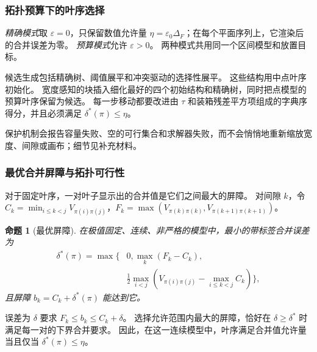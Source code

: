 \documentclass[fontset=none,zihao=5,a4paper]{ctexart}
\newtheorem{proposition}{命题}
\begin{document}
\subsubsection{拓扑预算下的叶序选择}
\emph{精确模式}取 $\varepsilon=0$，只保留数值允许量 $\eta=\varepsilon_0\Delta_F$；在每个平面序列上，它渲染后的合并误差为零。
\emph{预算模式}允许 $\varepsilon>0$。
两种模式共用同一个区间模型和放置目标。

候选生成包括精确树、阈值展平和冲突驱动的选择性展平。
这些结构用中点叶序初始化。
宽度感知的块插入细化最好的四个初始结构和精确树，同时把点模型的预算叶序保留为候选。
每一步移动都要改进由 $\tau$ 和装箱残差平方项组成的字典序得分，并且必须满足 $\delta^*(\pi)\le\eta$。

保护机制会报告容量失败、空的可行集合和求解器失败，而不会悄悄地重新缩放宽度、间隙或画布；细节见补充材料。

\subsubsection{最优合并屏障与拓扑可行性}
对于固定叶序，一对叶子显示出的合并值是它们之间最大的屏障。
对间隙 $k$，令 $C_k=\min_{i\le k<j}V_{\pi(i)\pi(j)}$，$F_k=\max(V_{\pi(k)\pi(k)},V_{\pi(k+1)\pi(k+1)})$。
\begin{proposition}[最优屏障]\label{prop:barriers}
在极值固定、连续、非严格的模型中，最小的带标签合并误差为
\begin{equation}\label{eq:delta}
\begin{split}
 \delta^*(\pi)=\max\bigg\{&0,\max_k(F_k-C_k),\\
 &\frac12\max_{i<j}\left(V_{\pi(i)\pi(j)}-
                         \max_{i\le k<j}C_k\right)\bigg\},
\end{split}
\end{equation}
且屏障 $b_k=C_k+\delta^*(\pi)$ 能达到它。
\end{proposition}
误差为 $\delta$ 要求 $F_k\le b_k\le C_k+\delta$。
选择允许范围内最大的屏障，恰好在 $\delta\ge\delta^*$ 时满足每一对的下界合并要求。
因此，在这一连续模型中，叶序满足合并值允许量当且仅当 $\delta^*(\pi)\le\eta$。
\end{document}
